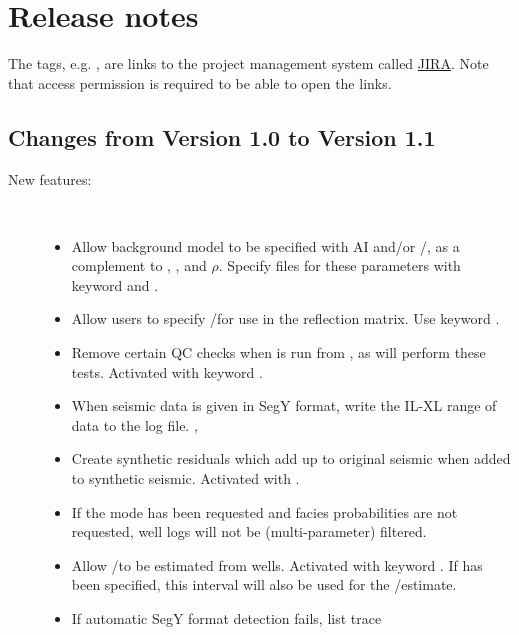 \chapter{Release notes}
The tags, e.g. , are links to the \crava project management
system called
\href{http://www.atlassian.com/software/jira/}{JIRA}.
 Note that access permission is
required to be able to open the links.

\section{Changes from \crava Version 1.0 to Version 1.1}

\begin{description}

\item [New features:] \mbox{ }
  \begin{itemize}
    \item Allow background model to be specified with AI and\!/\!or
      \vp/\vs, as a complement to \vp, \vs, and $\rho$. Specify files
      for these parameters with keyword  and
      . 
    \item Allow users to specify \vp/\vs for use in the
      reflection matrix.  Use keyword . 
    \item Remove certain QC checks when \crava is run from
      \rms, as \rms will perform these tests. Activated with keyword
      . 
    \item When seismic data is given in SegY format, write the IL-XL
      range of data to the log file. , 
    \item Create synthetic residuals which add up to original seismic
      when added to synthetic seismic. Activated with
      . 
    \item If the  mode has been requested and
      facies probabilities are not requested, well logs will not be
      (multi-parameter) filtered. 
    \item Allow \vp/\vs to be estimated from wells. Activated
      with keyword . If
       has been specified, this
      interval will also be used for the \vp/\vs estimate. 
    \item If automatic SegY format detection fails, list trace

\end{itemize}
\end{description}
